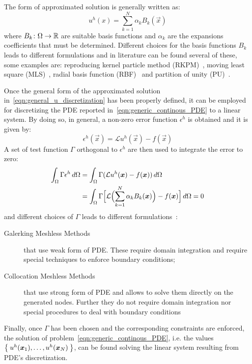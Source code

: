 The form of approximated solution is generally written as:
\begin{equation}
	\label{eqn:general_u_discretization}
	u^{h}({x}) = \sum_{k= 1}^{N} {\alpha_k B_k(\vec{x})}
\end{equation}
where $B_k\colon\Omega\to\R$ are suitable basis functions and $\alpha_k$ are the expansions coefficients that must be determined.
Different choices for the basis functions $B_k$ leads to different formulations and in literature can be found several of these, some examples are:  reproducing kernel particle method (RKPM)~\cite{Liu:RKPM}, moving least square (MLS)~\cite{Lancaster:MLS}, radial basis function (RBF)~\cite{Kansa:RBF_1, Kansa:RBF_2} and partition of unity (PU)~\cite{Schweitzer:PU}.

Once the general form of the approximated solution in~\eqref{eqn:general_u_discretization} has been properly defined, it can be employed for discretizing the PDE reported in~\eqref{eqn:generic_continous_PDE} to a linear system.
By doing so, in general, a non-zero error function $\epsilon^{h}$ is obtained and it is given by:
\begin{equation}
	\epsilon^{h}(\vec{x}) = \mathcal{L} u^{h}(\vec{x}) - f(\vec{x})
\end{equation}
A set of test function $\Gamma$ orthogonal to $\epsilon^{h}$ are then used to integrate the error to zero: 
\begin{equation}
	\begin{split}
		\int_{\Omega} \Gamma \epsilon^{h}\,d\Omega & = \int_{\Omega} \Gamma (\mathcal{L} u^{h}(\vec{x}) - f(\vec{x}))\,d\Omega  \\
		& = \int_{\Omega} \Gamma \Bigl[ \mathcal{L}\Bigl( \sum_{k= 1}^{N} {\alpha_k B_k(\vec{x})}\Bigr) - f(\vec{x})\Bigr]\,d\Omega = 0
	\end{split}
\end{equation}
and different choices of $\Gamma$ leads to different formulations~\cite{Chen:meshless_overview_after_20_years}:
\begin{description}
	\item[Galerking Meshless Methods] that use weak form of PDE. These require domain integration and require special techniques to enforce boundary conditions;
	\item[Collocation Meshless Methods] that use strong form of PDE and allows to solve them directly on the generated nodes. Further they do not require domain integration nor special procedures to deal with boundary conditions
\end{description}
Finally, once $\Gamma$ has been chosen and the corresponding constraints are enforced, the solution of problem~\eqref{eqn:generic_continous_PDE}, i.e. the values $\Set{u^h(\vec{x}_1), \dots, u^h(\vec{x}_N)}$, can be found solving the linear system  resulting from PDE's discretization.

